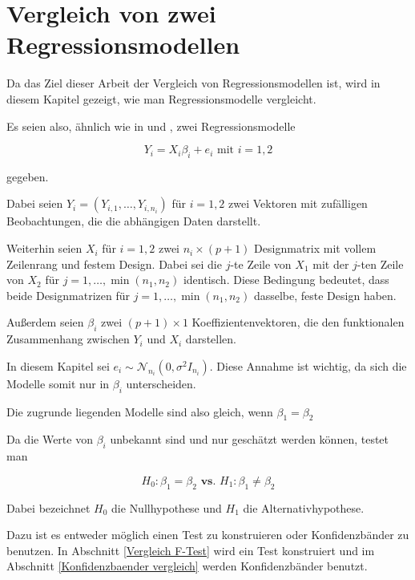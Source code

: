 \documentclass[12pt,a4paper]{article}
\theoremstyle{definition}
\theoremstyle{definition}
\theoremstyle{definition}
\theoremstyle{definition}
\begin{document}
\newpage
\section{Vergleich von zwei Regressionsmodellen}
\label{Vergleich von zwei Regressionsmodellen}
Da das Ziel dieser Arbeit der Vergleich von Regressionsmodellen ist, wird in diesem Kapitel gezeigt, wie man Regressionsmodelle vergleicht. 

Es seien also, ähnlich wie in \cite[113]{Liu64} und \cite[178]{Liu64}, zwei Regressionsmodelle 

\begin{equation}
\label{Grundmodell_Hypothesentest}
Y_{i} = X_{i} \beta_{i} + e_{i} \text{ mit } i = 1,2  
\end{equation}

gegeben.

Dabei seien $Y_{i} = (Y_{i,1}, \ldots, Y_{i,n_i})$ für $i=1,2$ zwei Vektoren mit zufälligen Beobachtungen, die die abhängigen Daten darstellt.

Weiterhin seien $X_i$ für $i=1,2$ zwei $n_i \times (p+1)$ Designmatrix mit vollem Zeilenrang und festem Design. Dabei sei die $j$-te Zeile von $X_1$ mit der $j$-ten Zeile von $X_2$ für $j=1,\ldots, \min(n_1, n_2)$ identisch. Diese Bedingung bedeutet, dass beide Designmatrizen für $j=1, \ldots, \min(n_1, n_2)$ dasselbe, feste Design haben.

Außerdem seien $\beta_i$ zwei $(p+1) \times 1$ Koeffizientenvektoren, die den funktionalen Zusammenhang zwischen $Y_i$ und $X_i$ darstellen.

In diesem Kapitel sei $e_i \sim \mathscr{N}_{n_i}(0,\sigma^2 I_{n_i})$. Diese Annahme ist wichtig, da sich die Modelle somit nur in $\beta_i$ unterscheiden.

Die zugrunde liegenden Modelle sind also gleich, wenn $\beta_{1}=\beta_{2}$ 

Da die Werte von $\beta_{i}$ unbekannt sind und nur geschätzt werden können, testet man

\begin{equation}
H_{0} : \beta_{1} = \beta_{2}  \textbf{ vs. }  H_{1} : \beta_{1} \neq \beta_{2} \label{Hypothese}
\end{equation}

Dabei bezeichnet $H_{0}$ die \gls{Nullhypothese} und $H_{1}$ die Alternativhypothese.

Dazu ist es entweder möglich einen Test zu konstruieren oder Konfidenzbänder zu benutzen. In Abschnitt \ref{Vergleich F-Test} wird ein Test konstruiert und im Abschnitt \ref{Konfidenzbaender vergleich} werden Konfidenzbänder benutzt.
\end{document}
